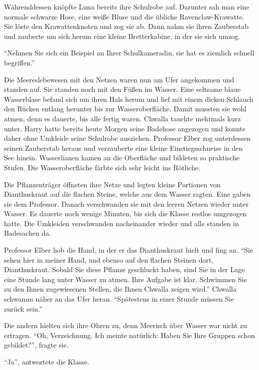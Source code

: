 Währenddessen knöpfte Luna bereits ihre Schulrobe auf. Darunter sah man eine normale schwarze Hose, eine weiße Bluse und die übliche Ravenclaw-Krawatte. Sie löste den Krawattenknoten und zog sie ab. Dann nahm sie ihren Zauberstab und zauberte um sich herum eine kleine Bretterkabine, in der sie sich umzog.

\enquote{Nehmen Sie sich ein Beispiel an Ihrer Schulkameradin, sie hat es ziemlich schnell begriffen.}

Die Meereslebewesen mit den Netzen waren nun am Ufer angekommen und standen auf. Sie standen noch mit den Füßen im Wasser. Eine seltsame blaue Wasserblase befand sich um ihren Hals herum und lief mit einem dicken Schlauch den Rücken entlang herunter bis zur Wasseroberfläche. Damit mussten sie wohl atmen, denn es dauerte, bis alle fertig waren. Chwalla tauchte mehrmals kurz unter. Harry hatte bereits heute Morgen seine Badehose angezogen und konnte daher ohne Umkleide seine Schulrobe ausziehen. Professor Elber zog unterdessen seinen Zauberstab heraus und verzauberte eine kleine Einstiegsschneise in den See hinein. Wasserlianen kamen an die Oberfläche und bildeten so praktische Stufen. Die Wasseroberfläche färbte sich sehr leicht ins Rötliche.

Die Pflanzenträger öffneten ihre Netze und legten kleine Portionen von Dianthuskraut auf die flachen Steine, welche aus dem Wasser ragten. Eine gaben sie dem Professor. Danach verschwanden sie mit den leeren Netzen wieder unter Wasser. Es dauerte noch wenige Minuten, bis sich die Klasse restlos umgezogen hatte. Die Umkleiden verschwanden nacheinander wieder und alle standen in Badesachen da.

Professor Elber hob die Hand, in der er das Dianthuskraut hielt und fing an. \enquote{Sie sehen hier in meiner Hand, und ebenso auf den flachen Steinen dort, Dianthuskraut. Sobald Sie diese Pflanze geschluckt haben, sind Sie in der Lage eine Stunde lang unter Wasser zu atmen. Ihre Aufgabe ist klar. Schwimmen Sie zu den Ihnen zugewiesenen Stellen, die Ihnen Chwalla zeigen wird.} Chwalla schwamm näher an das Ufer heran. \enquote{Spätestens in einer Stunde müssen Sie zurück sein.}

 Die andern hielten sich ihre Ohren zu, denn Meerisch über Wasser war nicht zu ertragen. \enquote{Oh, Verzeichnung. Ich meinte natürlich: Haben Sie Ihre Gruppen schon gebildet?}, fragte sie.

\enquote{Ja}, antwortete die Klasse.


